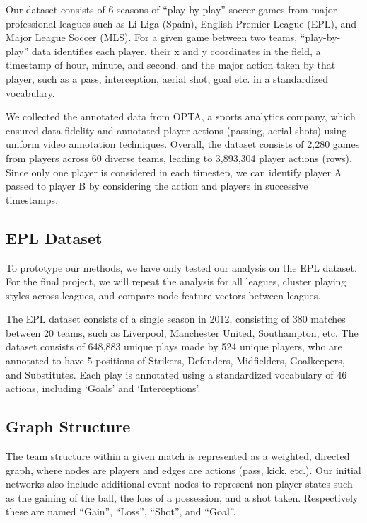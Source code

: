 Our dataset consists of 6 seasons of ``play-by-play'' soccer games from major professional leagues such as Li Liga (Spain), English Premier League (EPL), and Major League Soccer (MLS). For a given game between two teams, ``play-by-play'' data identifies each player, their x and y coordinates in the field, a timestamp of hour, minute, and second, and the major action taken by that player, such as a pass, interception, aerial shot, goal etc. in a standardized vocabulary. 

We collected the annotated data from OPTA, a sports analytics company, which ensured data fidelity and annotated player actions (passing, aerial shots) using uniform video annotation techniques. Overall, the dataset consists of 2,280 games from  players across 60 diverse teams, leading to  3,893,304 player actions (rows). Since only one player is considered in each timestep, we can identify player A passed to player B by considering the action and players in successive timestamps.  

\subsection{EPL Dataset}
To prototype our methods, we have only tested our analysis on the EPL dataset.
For the final project, we will repeat the analysis for all leagues, cluster playing styles across leagues, and compare node feature vectors between leagues.

The EPL dataset consists of a single season in 2012, consisting of 380 matches between 20 teams, such as Liverpool, Manchester United, Southampton, etc. The dataset consists of 648,883 unique plays made by 524 unique players, who are annotated to have 5 positions of Strikers, Defenders, Midfielders, Goalkeepers, and Substitutes. Each play is annotated using a standardized vocabulary of 46 actions, including `Goals' and `Interceptions'.


\subsection{Graph Structure}
The team structure within a given match is represented as a weighted, directed graph, where nodes are players and edges are actions (pass, kick, etc.). Our initial networks also include additional event nodes to represent non-player states such as the gaining of the ball, the loss of a possession, and a shot taken. Respectively these are named ``Gain'', ``Loss'', ``Shot'', and ``Goal''. 

